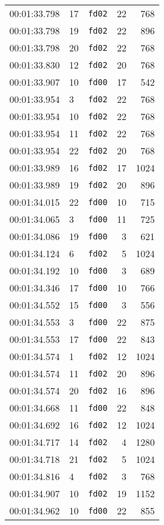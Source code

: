\documentclass{article}
\begin{document}
\begin{longtable}{lllrr}
00:01:33.798 & 17 & \texttt{fd02} & 22 & 768 \\
00:01:33.798 & 19 & \texttt{fd02} & 22 & 896 \\
00:01:33.798 & 20 & \texttt{fd02} & 22 & 768 \\
00:01:33.830 & 12 & \texttt{fd02} & 20 & 768 \\
00:01:33.907 & 10 & \texttt{fd00} & 17 & 542 \\
00:01:33.954 & 3 & \texttt{fd02} & 22 & 768 \\
00:01:33.954 & 10 & \texttt{fd02} & 22 & 768 \\
00:01:33.954 & 11 & \texttt{fd02} & 22 & 768 \\
00:01:33.954 & 22 & \texttt{fd02} & 20 & 768 \\
00:01:33.989 & 16 & \texttt{fd02} & 17 & 1024 \\
00:01:33.989 & 19 & \texttt{fd02} & 20 & 896 \\
00:01:34.015 & 22 & \texttt{fd00} & 10 & 715 \\
00:01:34.065 & 3 & \texttt{fd00} & 11 & 725 \\
00:01:34.086 & 19 & \texttt{fd00} & 3 & 621 \\
00:01:34.124 & 6 & \texttt{fd02} & 5 & 1024 \\
00:01:34.192 & 10 & \texttt{fd00} & 3 & 689 \\
00:01:34.346 & 17 & \texttt{fd00} & 10 & 766 \\
00:01:34.552 & 15 & \texttt{fd00} & 3 & 556 \\
00:01:34.553 & 3 & \texttt{fd00} & 22 & 875 \\
00:01:34.553 & 17 & \texttt{fd00} & 22 & 843 \\
00:01:34.574 & 1 & \texttt{fd02} & 12 & 1024 \\
00:01:34.574 & 11 & \texttt{fd02} & 20 & 896 \\
00:01:34.574 & 20 & \texttt{fd02} & 16 & 896 \\
00:01:34.668 & 11 & \texttt{fd00} & 22 & 848 \\
00:01:34.692 & 16 & \texttt{fd02} & 12 & 1024 \\
00:01:34.717 & 14 & \texttt{fd02} & 4 & 1280 \\
00:01:34.718 & 21 & \texttt{fd02} & 5 & 1024 \\
00:01:34.816 & 4 & \texttt{fd02} & 3 & 768 \\
00:01:34.907 & 10 & \texttt{fd02} & 19 & 1152 \\
00:01:34.962 & 10 & \texttt{fd00} & 22 & 855 \\

\end{longtable}
\end{document}
